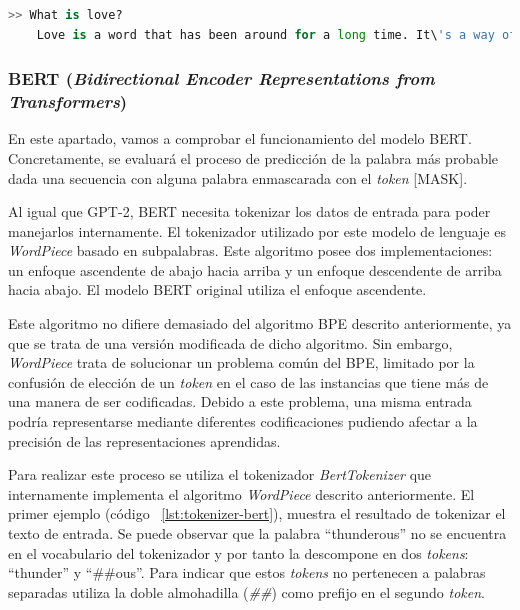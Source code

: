 \begin{lstlisting}[language=Python, caption=Ejemplo de uso de \textit{GPT2LMHeadModel}, label={lst:model-gpt2}]
	>> What is love?
	Love is a word that has been around for a long time. It\'s a way of saying "I love you, but I don\'t know what it means to love someone else."	
\end{lstlisting} 

\subsubsection{BERT (\textit{Bidirectional Encoder Representations from Transformers})}

En este apartado, vamos a comprobar el funcionamiento del modelo BERT. Concretamente, se evaluará el proceso de predicción de la palabra más probable dada una secuencia con alguna palabra enmascarada con el \textit{token} [MASK].

Al igual que GPT-2, BERT necesita tokenizar los datos de entrada para poder manejarlos internamente. El tokenizador utilizado por este modelo de lenguaje es \textit{WordPiece} \citep{wordpiece} basado en subpalabras. Este algoritmo posee dos implementaciones: un enfoque ascendente de abajo hacia arriba y un enfoque descendente de arriba hacia abajo. El modelo BERT original utiliza el enfoque ascendente.

Este algoritmo no difiere demasiado del algoritmo BPE descrito anteriormente, ya que se trata de una versión modificada de dicho algoritmo. Sin embargo, \textit{WordPiece} trata de solucionar un problema común del BPE, limitado por la confusión de elección de un \textit{token} en el caso de las instancias que tiene más de una manera de ser codificadas. Debido a este problema, una misma entrada podría representarse mediante diferentes codificaciones pudiendo afectar a la precisión de las representaciones aprendidas.

Para realizar este proceso se utiliza el tokenizador \textit{BertTokenizer} que internamente
implementa el algoritmo \textit{WordPiece} descrito anteriormente. El primer ejemplo (código ~\ref{lst:tokenizer-bert}), muestra el resultado de tokenizar el texto de entrada. Se puede observar que la palabra ``thunderous'' no se encuentra en el vocabulario del tokenizador y por tanto la descompone en dos \textit{tokens}: ``thunder'' y ``\#\#ous''. Para indicar que estos \textit{tokens} no pertenecen a palabras separadas utiliza la doble almohadilla (\textit{\#\#}) como prefijo en el segundo \textit{token}.

